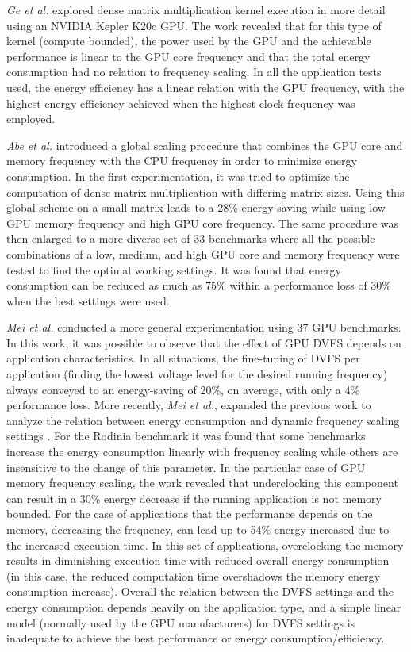 \textit{Ge et al.} \cite{ge_effects_2013} explored dense matrix multiplication kernel execution in more detail using an NVIDIA Kepler K20c GPU.  The work revealed that for this type of kernel (compute bounded), the power used by the GPU and the achievable performance is linear to the GPU core frequency and that the total energy consumption had no relation to frequency scaling. In all the application tests used, the energy efficiency has a linear relation with the GPU frequency, with the highest energy efficiency achieved when the highest clock frequency was employed.

\textit{Abe et al.} \cite{abe_power_2012} introduced a global scaling procedure that combines the GPU core and memory frequency with the CPU frequency in order to minimize energy consumption. In the first experimentation, it was tried to optimize the computation of dense matrix multiplication with differing matrix sizes. Using this global scheme on a small matrix leads to a 28\% energy saving while using low GPU memory frequency and high GPU core frequency. The same procedure was then enlarged to a more diverse set of 33 benchmarks where all the possible combinations of a low, medium, and high GPU core and memory frequency were tested to find the optimal working settings. It was found that energy consumption can be reduced as much as 75\% within a performance loss of 30\% when the best settings were used. 

\textit{Mei et al.} \cite{mei_measurement_2013} conducted a more general experimentation using 37 GPU benchmarks. In this work, it was possible to observe that the effect of GPU DVFS depends on application characteristics. In all situations, the fine-tuning of DVFS per application (finding the lowest voltage level for the desired running frequency) always conveyed to an energy-saving of 20\%, on average, with only a 4\% performance loss. More recently, \textit{Mei et al.}, expanded the previous work to analyze the relation between energy consumption and dynamic frequency scaling settings \cite{mei_survey_2016}. For the  Rodinia benchmark \cite{che_rodinia:_2009} it was found that some benchmarks increase the energy consumption linearly with frequency scaling while others are insensitive to the change of this parameter. In the particular case of GPU memory frequency scaling, the work revealed that underclocking this component can result in a 30\% energy decrease if the running application is not memory bounded. For the case of applications that the performance depends on the memory, decreasing the frequency, can lead up to 54\% energy increased due to the increased execution time. In this set of applications, overclocking the memory results in diminishing execution time with reduced overall energy consumption (in this case, the reduced computation time overshadows the memory energy consumption increase). Overall the relation between the DVFS settings and the energy consumption depends heavily on the application type, and a simple linear model (normally used by the GPU manufacturers) for DVFS settings is inadequate to achieve the best performance or energy consumption/efficiency.

